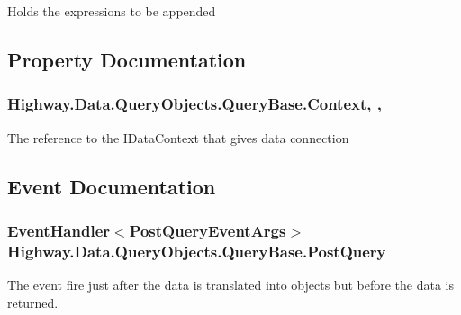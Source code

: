 Holds the expressions to be appended 



\subsection{Property Documentation}
\hypertarget{class_highway_1_1_data_1_1_query_objects_1_1_query_base_aa8ca309734c39e9e78853e2a76c041f1}{
\subsubsection[{Context}]{ Highway.\-Data.\-Query\-Objects.\-Query\-Base.\-Context\hspace{0.3cm}{\ttfamily [get]}, {\ttfamily [set]}, {\ttfamily [protected]}}}\label{class_highway_1_1_data_1_1_query_objects_1_1_query_base_aa8ca309734c39e9e78853e2a76c041f1}


The reference to the I\-Data\-Context that gives data connection 



\subsection{Event Documentation}
\hypertarget{class_highway_1_1_data_1_1_query_objects_1_1_query_base_a75da4f1ac849eac015645365f982a9ff}{
\subsubsection[{Post\-Query}]{\setlength{\rightskip}{0pt plus 5cm}Event\-Handler$<${\bf Post\-Query\-Event\-Args}$>$ Highway.\-Data.\-Query\-Objects.\-Query\-Base.\-Post\-Query}}\label{class_highway_1_1_data_1_1_query_objects_1_1_query_base_a75da4f1ac849eac015645365f982a9ff}


The event fire just after the data is translated into objects but before the data is returned. 



